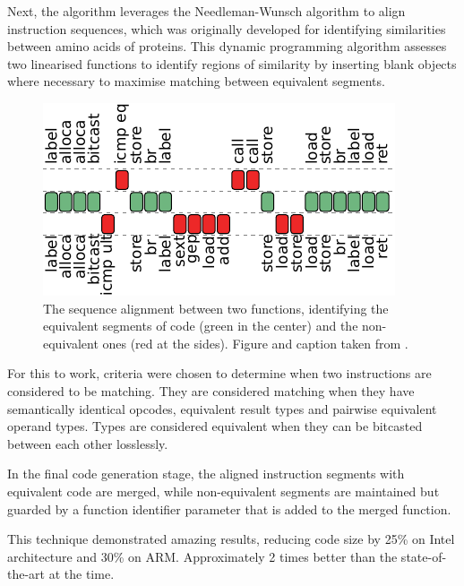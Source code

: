 Next, the algorithm leverages the Needleman-Wunsch algorithm to align instruction sequences, which was originally developed for identifying similarities between amino acids of proteins. This dynamic programming algorithm assesses two linearised functions to identify regions of similarity by inserting blank objects where necessary to maximise matching between equivalent segments. 

\begin{figure}[tbh!]
\centering
\includegraphics[scale=1]{Figures/FMSA_FunctionSA.pdf}
\caption{The sequence alignment between two functions, identifying the equivalent segments of code (green in the center) and the non-equivalent ones (red at the sides). Figure and caption taken from \cite{FunctionMergingSequenceAlignment}.}\label{fig:SequenceAlignment2Funcs}
\end{figure}

For this to work, criteria were chosen to determine when two instructions are considered to be matching. They are considered matching when they have semantically identical opcodes, equivalent result types and pairwise equivalent operand types. Types are considered equivalent when they can be bitcasted between each other losslessly.

In the final code generation stage, the aligned instruction segments with equivalent code are merged, while non-equivalent segments are maintained but guarded by a function identifier parameter that is added to the merged function.


This technique demonstrated amazing results, reducing code size by 25\% on Intel architecture and 30\% on ARM. Approximately 2 times better than the state-of-the-art at the time.

